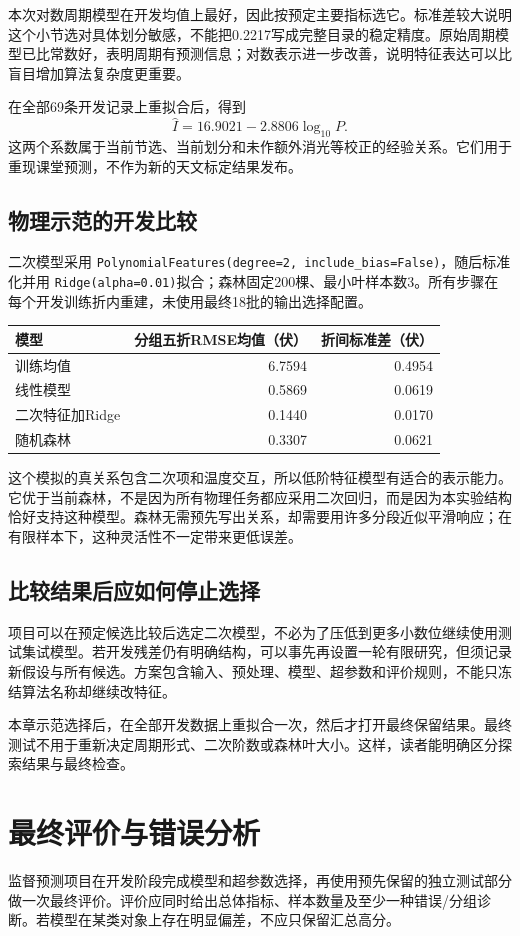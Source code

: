 本次对数周期模型在开发均值上最好，因此按预定主要指标选它。标准差较大说明这个小节选对具体划分敏感，不能把0.2217写成完整目录的稳定精度。原始周期模型已比常数好，表明周期有预测信息；对数表示进一步改善，说明特征表达可以比盲目增加算法复杂度更重要。

在全部69条开发记录上重拟合后，得到
\[
\widehat I=16.9021-2.8806\log_{10}P.
\]
这两个系数属于当前节选、当前划分和未作额外消光等校正的经验关系。它们用于重现课堂预测，不作为新的天文标定结果发布。

\subsection{物理示范的开发比较}
二次模型采用 \texttt{PolynomialFeatures(degree=2, include\_bias=False)}，随后标准化并用 \texttt{Ridge(alpha=0.01)}拟合；森林固定200棵、最小叶样本数3。所有步骤在每个开发训练折内重建，未使用最终18批的输出选择配置。
\begin{center}\small
\begin{tabular}{lrr}\toprule
模型&分组五折RMSE均值（伏）&折间标准差（伏）\\\midrule
训练均值&6.7594&0.4954\\
线性模型&0.5869&0.0619\\
二次特征加Ridge&0.1440&0.0170\\
随机森林&0.3307&0.0621\\\bottomrule
\end{tabular}\end{center}

这个模拟的真关系包含二次项和温度交互，所以低阶特征模型有适合的表示能力。它优于当前森林，不是因为所有物理任务都应采用二次回归，而是因为本实验结构恰好支持这种模型。森林无需预先写出关系，却需要用许多分段近似平滑响应；在有限样本下，这种灵活性不一定带来更低误差。

\subsection{比较结果后应如何停止选择}
项目可以在预定候选比较后选定二次模型，不必为了压低到更多小数位继续使用测试集试模型。若开发残差仍有明确结构，可以事先再设置一轮有限研究，但须记录新假设与所有候选。方案包含输入、预处理、模型、超参数和评价规则，不能只冻结算法名称却继续改特征。

本章示范选择后，在全部开发数据上重拟合一次，然后才打开最终保留结果。最终测试不用于重新决定周期形式、二次阶数或森林叶大小。这样，读者能明确区分探索结果与最终检查。

\section{最终评价与错误分析}
监督预测项目在开发阶段完成模型和超参数选择，再使用预先保留的独立测试部分做一次最终评价。评价应同时给出总体指标、样本数量及至少一种错误/分组诊断。若模型在某类对象上存在明显偏差，不应只保留汇总高分。

